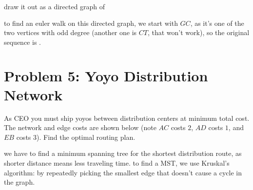 \medskip
\solution

draw it out as a directed graph of

\begin{center}
\end{center}

to find an euler walk on this directed graph, we start with $GC$, as it's one of the two vertices with odd degree (another one is $CT$, that won't work), so the original sequence is . 

\vspace{1em}
\hrulefill

\newpage

\section*{Problem 5: Yoyo Distribution Network}
As CEO you must ship yoyos between distribution centers at minimum total cost. The network and edge costs are shown below (note $AC$ costs $2$, $AD$ costs $1$, and $EB$ costs $3$). Find the optimal routing plan.

\medskip
\solution

we have to find a minimum spanning tree for the shortest distribution route, as shorter distance means less traveling time. to find a MST, we use Kruskal's algorithm: by repeatedly picking the smallest edge that doesn't cause a cycle in the graph. 

